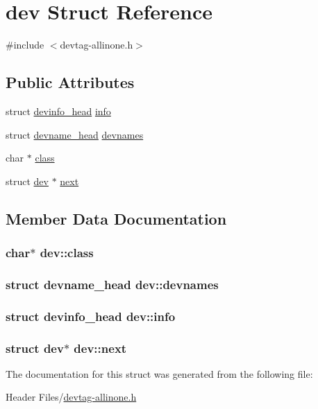 \hypertarget{structdev}{\section{dev \-Struct \-Reference}
\label{structdev}
}


{\ttfamily \#include $<$devtag-\/allinone.\-h$>$}

\subsection*{\-Public \-Attributes}
\begin{DoxyCompactItemize}
\item 
struct \hyperlink{structdevinfo__head}{devinfo\-\_\-head} \hyperlink{structdev_a17b6b9e15213b3ba2719406193446c8a}{info}
\item 
struct \hyperlink{structdevname__head}{devname\-\_\-head} \hyperlink{structdev_a3bb0e0c36893b9b9b95b79b267627c92}{devnames}
\item 
char $\ast$ \hyperlink{structdev_a6ec9bc0acb17639af3e8b0531d67267b}{class}
\item 
struct \hyperlink{structdev}{dev} $\ast$ \hyperlink{structdev_a72f2170ba726c7f2ce26d9227dec6ca5}{next}
\end{DoxyCompactItemize}


\subsection{\-Member \-Data \-Documentation}
\hypertarget{structdev_a6ec9bc0acb17639af3e8b0531d67267b}{
\subsubsection[{class}]{\setlength{\rightskip}{0pt plus 5cm}char$\ast$ {\bf dev\-::class}}}\label{structdev_a6ec9bc0acb17639af3e8b0531d67267b}
\hypertarget{structdev_a3bb0e0c36893b9b9b95b79b267627c92}{
\subsubsection[{devnames}]{\setlength{\rightskip}{0pt plus 5cm}struct {\bf devname\-\_\-head} {\bf dev\-::devnames}}}\label{structdev_a3bb0e0c36893b9b9b95b79b267627c92}
\hypertarget{structdev_a17b6b9e15213b3ba2719406193446c8a}{
\subsubsection[{info}]{\setlength{\rightskip}{0pt plus 5cm}struct {\bf devinfo\-\_\-head} {\bf dev\-::info}}}\label{structdev_a17b6b9e15213b3ba2719406193446c8a}
\hypertarget{structdev_a72f2170ba726c7f2ce26d9227dec6ca5}{
\subsubsection[{next}]{\setlength{\rightskip}{0pt plus 5cm}struct {\bf dev}$\ast$ {\bf dev\-::next}}}\label{structdev_a72f2170ba726c7f2ce26d9227dec6ca5}


\-The documentation for this struct was generated from the following file\-:\begin{DoxyCompactItemize}
\item 
\-Header Files/\hyperlink{devtag-allinone_8h}{devtag-\/allinone.\-h}\end{DoxyCompactItemize}
